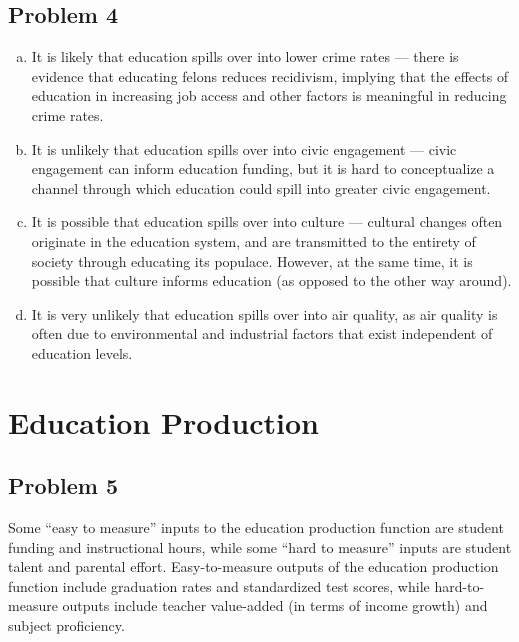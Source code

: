 \documentclass[8pt]{extarticle}
\begin{document}
\begin{enumerate}[(a)]
\begin{center}
    \end{center}
\end{enumerate}
\subsection{Problem 4}%
\begin{enumerate}[(a)]
  \item It is likely that education spills over into lower crime rates --- there is evidence that educating felons reduces recidivism, implying that the effects of education in increasing job access and other factors is meaningful in reducing crime rates.
  \item It is unlikely that education spills over into civic engagement --- civic engagement can inform education funding, but it is hard to conceptualize a channel through which education could spill into greater civic engagement.
  \item It is possible that education spills over into culture --- cultural changes often originate in the education system, and are transmitted to the entirety of society through educating its populace. However, at the same time, it is possible that culture informs education (as opposed to the other way around).
  \item It is very unlikely that education spills over into air quality, as air quality is often due to environmental and industrial factors that exist independent of education levels.
\end{enumerate}
\section{Education Production}%
\subsection{Problem 5}%
Some ``easy to measure'' inputs to the education production function are student funding and instructional hours, while some ``hard to measure'' inputs are student talent and parental effort. Easy-to-measure outputs of the education production function include graduation rates and standardized test scores, while hard-to-measure outputs include teacher value-added (in terms of income growth) and subject proficiency.
\end{document}
